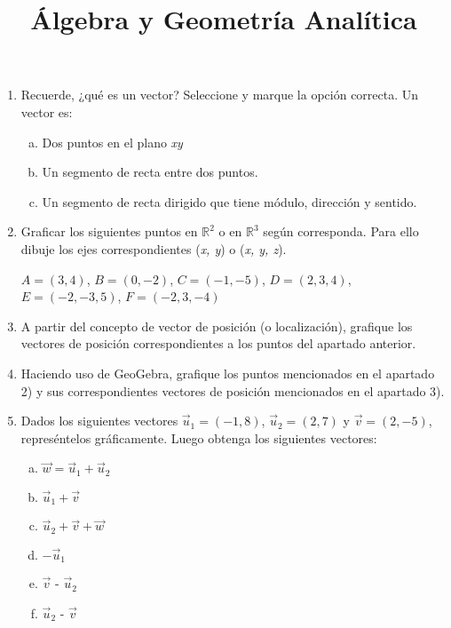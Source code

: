 \documentclass[11pt,a4paper]{article}
\title{\'Algebra y Geometr\'ia Anal\'itica} %
\date{}
\begin{document}

\maketitle %

\begin{enumerate}
\setcounter{enumi}{0} %

\item Recuerde, ¿qu\'e es un vector? Seleccione y marque la opci\'on correcta. Un vector es:

\begin{enumerate}[a)]
\item Dos puntos en el plano \textit{xy}
\item Un segmento de recta entre dos puntos.
\item Un segmento de recta dirigido que tiene m\'odulo, direcci\'on y sentido.
\end{enumerate}

\item Graficar los siguientes puntos en $\mathbb{R}^{2}$ o en $\mathbb{R}^{3}$ seg\'un corresponda. Para ello dibuje los ejes correspondientes (\textit{x, y}) o (\textit{x, y, z}). \par

$A = (3, 4)$, $B = (0, -2)$, $C = (-1, -5)$, $D = (2, 3, 4)$, $E = (-2, -3, 5)$, $F = (-2, 3, -4)$ 

\item A partir del concepto de vector de posici\'on (o localizaci\'on), grafique los vectores de posici\'on correspondientes a los puntos del apartado anterior.

\item Haciendo uso de GeoGebra, grafique los puntos mencionados en el apartado 2) y sus correspondientes vectores de posici\'on mencionados en el apartado 3).

\item Dados los siguientes vectores $\vec{u}_{1} = (-1, 8)$, $\vec{u}_{2} = (2, 7)$ y $\vec{v} = (2, -5)$, repres\'entelos gr\'aficamente. Luego obtenga los siguientes vectores:

\begin{enumerate}[a)]
\item $\vec{w} = \vec{u}_{1} + \vec{u}_{2}$
\item $\vec{u}_{1} + \vec{v}$ 
\item $\vec{u}_{2} + \vec{v} + \vec{w}$
\item $-\vec{u}_{1}$
\item $\vec{v}$ - $\vec{u}_{2}$
\item $\vec{u}_{2}$ - $\vec{v}$
\end{enumerate}


\end{enumerate}
\end{document}
